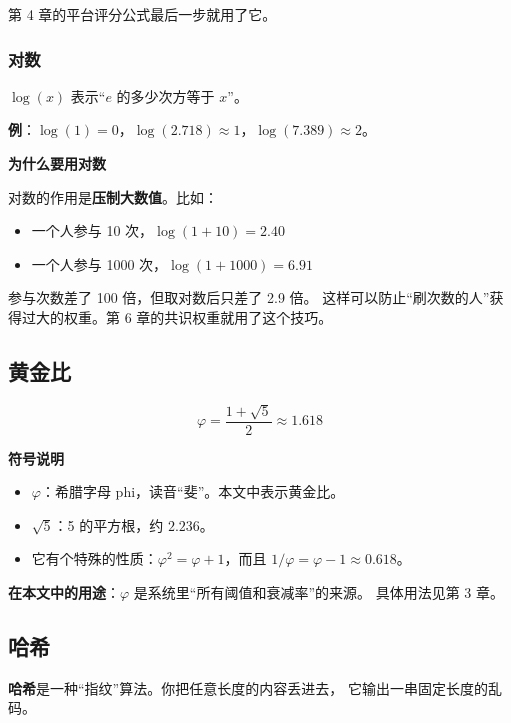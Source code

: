 \documentclass[UTF8,a4paper,11pt]{ctexart}
\newenvironment{explainbox}[1]
{\begin{center}\begin{minipage}{0.94\textwidth}\colorbox{boxbg}{\parbox{0.92\textwidth}{\textbf{#1}\par\vspace{2pt}}}}
{\end{minipage}\end{center}}
\newcommand{\term}[1]{\textbf{#1}}
\newcommand{\hl}[1]{\textcolor{blue!70!black}{\textbf{#1}}}
\begin{document}
第 4 章的平台评分公式最后一步就用了它。

\subsubsection{对数}

$\log(x)$ 表示“$e$ 的多少次方等于 $x$”。

\textbf{例}：$\log(1) = 0$，$\log(2.718) \approx 1$，$\log(7.389) \approx 2$。

\begin{explainbox}{为什么要用对数}
对数的作用是\hl{压制大数值}。比如：
\begin{itemize}[leftmargin=1.4em,itemsep=1pt]
\item 一个人参与 10 次，$\log(1+10) = 2.40$
\item 一个人参与 1000 次，$\log(1+1000) = 6.91$
\end{itemize}
参与次数差了 100 倍，但取对数后只差了 2.9 倍。
这样可以防止“刷次数的人”获得过大的权重。第 6 章的共识权重就用了这个技巧。
\end{explainbox}

\subsection{黄金比}

\begin{equation}
\varphi = \frac{1 + \sqrt{5}}{2} \approx 1.618
\end{equation}

\begin{explainbox}{符号说明}
\begin{itemize}[leftmargin=1.4em,itemsep=1pt]
\item $\varphi$：希腊字母 phi，读音“斐”。本文中表示黄金比。
\item $\sqrt{5}$：5 的平方根，约 $2.236$。
\item 它有个特殊的性质：$\varphi^2 = \varphi + 1$，而且 $1/\varphi = \varphi - 1 \approx 0.618$。
\end{itemize}
\end{explainbox}

\textbf{在本文中的用途}：$\varphi$ 是系统里“所有阈值和衰减率”的来源。
具体用法见第 3 章。

\subsection{哈希}

\term{哈希}是一种“指纹”算法。你把任意长度的内容丢进去，
它输出一串固定长度的乱码。
\end{document}
